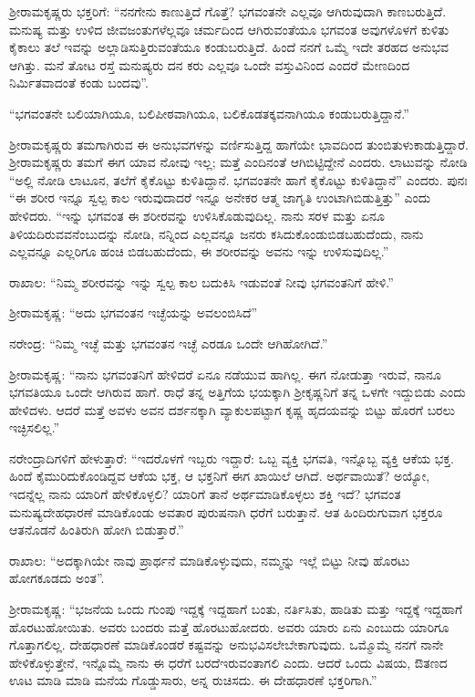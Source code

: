 ಶ‍್ರೀರಾಮಕೃಷ್ಣರು ಭಕ್ತರಿಗೆ: “ನನಗೇನು ಕಾಣುತ್ತಿದೆ ಗೊತ್ತೆ? ಭಗವಂತನೇ ಎಲ್ಲವೂ ಆಗಿರುವುದಾಗಿ ಕಾಣಬರುತ್ತಿದೆ. ಮನುಷ್ಯ ಮತ್ತು ಉಳಿದ ಜೀವಜಂತುಗಳೆಲ್ಲವೂ ಚರ್ಮದಿಂದ ಆಗಿರುವಂತೆಯೂ ಭಗವಂತ ಅವುಗಳೊಳಗೆ ಕುಳಿತು ಕೈಕಾಲು ತಲೆ ಇವನ್ನು ಅಲ್ಲಾಡಿಸುತ್ತಿರುವಂತೆಯೂ ಕಂಡುಬರುತ್ತಿದೆ. ಹಿಂದೆ ನನಗೆ ಒಮ್ಮೆ ಇದೇ ತರಹದ ಅನುಭವ ಆಗಿತ್ತು. ಮನೆ ತೋಟ ರಸ್ತೆ ಮನುಷ್ಯರು ದನ ಕರು ಎಲ್ಲವೂ ಒಂದೇ ವಸ್ತುವಿನಿಂದ ಎಂದರೆ ಮೇಣದಿಂದ ನಿರ್ಮಿತವಾದಂತೆ ಕಂಡು ಬಂದವು”.

“ಭಗವಂತನೇ ಬಲಿಯಾಗಿಯೂ, ಬಲಿಪೀಠವಾಗಿಯೂ, ಬಲಿಕೊಡತಕ್ಕವ\break ನಾಗಿಯೂ ಕಂಡುಬರುತ್ತಿದ್ದಾನೆ.”

\newpage

ಶ‍್ರೀರಾಮಕೃಷ್ಣರು ತಮಗಾಗಿರುವ ಈ ಅನುಭವಗಳನ್ನು ವರ್ಣಿಸುತ್ತಿದ್ದ ಹಾಗೆಯೇ ಭಾವದಿಂದ ತುಂಬಿತುಳುಕಾಡುತ್ತಿದ್ದಾರೆ. ಶ‍್ರೀರಾಮಕೃಷ್ಣರು ತಮಗೆ ಈಗ ಯಾವ ನೋವು ಇಲ್ಲ; ಮತ್ತೆ ಎಂದಿನಂತೆ ಆಗಿಬಿಟ್ಟಿದ್ದೇನೆ ಎಂದರು. ಲಾಟುವನ್ನು ನೋಡಿ “ಅಲ್ಲಿ ನೋಡಿ ಲಾಟೂನ, ತಲೆಗೆ ಕೈಕೊಟ್ಟು ಕುಳಿತಿದ್ದಾನೆ. ಭಗವಂತನೇ ಹಾಗೆ ಕೈಕೊಟ್ಟು ಕುಳಿತಿದ್ದಾನೆ” ಎಂದರು. ಪುನಃ “ಈ ಶರೀರ ಇನ್ನೂ ಸ್ವಲ್ಪ ಕಾಲ ಇರುವುದಾದರೆ ಇನ್ನೂ ಅನೇಕರ ಆತ್ಮ ಜಾಗೃತಿ ಉಂಟಾಗಿಬಿಡುತ್ತಿತ್ತು” ಎಂದು ಹೇಳಿದರು. “ಇನ್ನು ಭಗವಂತ ಈ ಶರೀರವನ್ನು ಉಳಿಸಿಕೊಡುವುದಿಲ್ಲ. ನಾನು ಸರಳ ಮತ್ತು ಏನೂ ತಿಳಿಯದಿರುವವನೆಂಬುದನ್ನು ನೋಡಿ, ನನ್ನಿಂದ ಎಲ್ಲವನ್ನೂ ಜನರು ಕಸಿದುಕೊಂಡುಬಿಡಬಹುದೆಂದು, ನಾನು ಎಲ್ಲವನ್ನೂ ಎಲ್ಲರಿಗೂ ಹಂಚಿ ಬಿಡಬಹುದೆಂದು, ಈ ಶರೀರವನ್ನು ಅವನು ಇನ್ನು ಉಳಿಸುವುದಿಲ್ಲ.”

ರಾಖಾಲ: “ನಿಮ್ಮ ಶರೀರವನ್ನು ಇನ್ನು ಸ್ವಲ್ಪ ಕಾಲ ಬದುಕಿಸಿ ಇಡುವಂತೆ ನೀವು ಭಗವಂತನಿಗೆ ಹೇಳಿ.”

ಶ‍್ರೀರಾಮಕೃಷ್ಣ: “ಅದು ಭಗವಂತನ ಇಚ್ಛೆಯನ್ನು ಅವಲಂಬಿಸಿದೆ”

ನರೇಂದ್ರ: “ನಿಮ್ಮ ಇಚ್ಛೆ ಮತ್ತು ಭಗವಂತನ ಇಚ್ಛೆ ಎರಡೂ ಒಂದೇ ಆಗಿಹೋಗಿದೆ.”

ಶ‍್ರೀರಾಮಕೃಷ್ಣ: “ನಾನು ಭಗವಂತನಿಗೆ ಹೇಳಿದರೆ ಏನೂ ನಡೆಯುವ ಹಾಗಿಲ್ಲ. ಈಗ ನೋಡುತ್ತಾ ಇರುವೆ, ನಾನೂ ಭಗವತಿಯೂ ಒಂದೇ ಆಗಿರುವ ಹಾಗೆ. ರಾಧೆ ತನ್ನ ಅತ್ತಿಗೆಯ ಭಯಕ್ಕಾಗಿ ಶ‍್ರೀಕೃಷ್ಣನಿಗೆ ತನ್ನ ಒಳಗೇ ಇದ್ದುಬಿಡು ಎಂದು ಹೇಳಿದಳು. ಆದರೆ ಮತ್ತೆ ಅವಳು ಅವನ ದರ್ಶನಕ್ಕಾಗಿ ವ್ಯಾಕುಲಪಟ್ಟಾಗ ಕೃಷ್ಣ ಹೃದಯವನ್ನು ಬಿಟ್ಟು ಹೊರಗೆ ಬರಲು ಇಚ್ಛಿಸಲಿಲ್ಲ.”

ನರೇಂದ್ರಾದಿಗಳಿಗೆ ಹೇಳುತ್ತಾರೆ: “ಇದರೊಳಗೆ ಇಬ್ಬರು ಇದ್ದಾರೆ: ಒಬ್ಬ ವ್ಯಕ್ತಿ ಭಗವತಿ, ಇನ್ನೊಬ್ಬ ವ್ಯಕ್ತಿ ಆಕೆಯ ಭಕ್ತ. ಹಿಂದೆ ಕೈಮುರಿದುಕೊಂಡಿದ್ದವ ಆಕೆಯ ಭಕ್ತ, ಆ ಭಕ್ತನಿಗೆ ಈಗ ಖಾಯಿಲೆ ಆಗಿದೆ. ಅರ್ಥವಾಯಿತೆ? ಅಯ್ಯೋ, ಇದನ್ನೆಲ್ಲ ನಾನು ಯಾರಿಗೆ ಹೇಳಿಕೊಳ್ಳಲಿ? ಯಾರಿಗೆ ತಾನೆ ಅರ್ಥಮಾಡಿಕೊಳ್ಳಲು ಶಕ್ತಿ ಇದೆ? ಭಗವಂತ ಮನುಷ್ಯದೇಹಧಾರಣೆ ಮಾಡಿಕೊಂಡು ಅವತಾರ ಪುರುಷನಾಗಿ ಧರೆಗೆ ಬರುತ್ತಾನೆ. ಆತ ಹಿಂದಿರುಗುವಾಗ ಭಕ್ತರೂ ಆತನೊಡನೆ ಹಿಂತಿರುಗಿ ಹೋಗಿ ಬಿಡುತ್ತಾರೆ.”

ರಾಖಾಲ: “ಅದಕ್ಕಾಗಿಯೇ ನಾವು ಪ್ರಾರ್ಥನೆ ಮಾಡಿಕೊಳ್ಳುವುದು, ನಮ್ಮನ್ನು ಇಲ್ಲೆ ಬಿಟ್ಟು ನೀವು ಹೊರಟು ಹೋಗಕೂಡದು ಅಂತ”.

ಶ‍್ರೀರಾಮಕೃಷ್ಣ: “ಭಜನೆಯ ಒಂದು ಗುಂಪು ಇದ್ದಕ್ಕೆ ಇದ್ದಹಾಗೆ ಬಂತು, ನರ್ತಿಸಿತು, ಹಾಡಿತು ಮತ್ತು ಇದ್ದಕ್ಕೆ ಇದ್ದಹಾಗೆ ಹೊರಟುಹೋಯಿತು. ಅವರು ಬಂದರು ಮತ್ತೆ ಹೊರಟುಹೋದರು. ಅವರು ಯಾರು ಏನು ಎಂಬುದು ಯಾರಿಗೂ ಗೊತ್ತಾಗಲಿಲ್ಲ. ದೇಹಧಾರಣೆ ಮಾಡಿಕೊಂಡರೆ ಕಷ್ಟವನ್ನು ಅನುಭವಿಸಲೇಬೇಕಾಗುವುದು. ಒಮ್ಮೊಮ್ಮೆ ನನಗೆ ನಾನೇ ಹೇಳಿಕೊಳ್ಳುತ್ತೇನೆ, ಇನ್ನೊಮ್ಮೆ ನಾನು ಈ ಧರೆಗೆ ಬರದೆ\break ಇರುವಂತಾಗಲಿ ಎಂದು. ಆದರೆ ಒಂದು ವಿಷಯ, ಔತಣದ ಊಟ ಮಾಡಿ ಮಾಡಿ ಮನೆಯ ಗೊಡ್ಡುಸಾರು, ಅನ್ನ ರುಚಿಸದು. ಈ ದೇಹಧಾರಣೆ ಭಕ್ತರಿಗಾಗಿ.”

